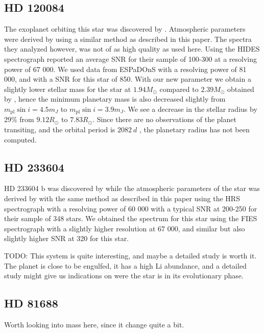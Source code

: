 \documentclass{aa}
\begin{document}
\subsection{HD 120084}
\label{sub:HD_120084}
The exoplanet orbiting this star was discovered by \citet{Sato2013}. Atmospheric
parameters were derived by \citet{Takeda2008} using a similar method as
described in this paper. The spectra they analyzed however, was not of as high
quality as used here. Using the HIDES spectrograph \citet{Takeda2008} reported
an average SNR for their sample of 100-300 at a resolving power of 67 000.
We used data from ESPaDOnS with a resolving power of 81 000, and with a SNR
for this star of 850. With our new parameter we obtain a slightly lower
stellar mass for the star at $1.94M_\odot$ compared to $2.39M_\odot$ obtained
by \cite{Takeda2008}, hence the minimum planetary mass is also decreased
slightly from $m_\mathrm{pl}\sin i=4.5m_J$ to $m_\mathrm{pl}\sin i=3.9m_J$.
We see a decrease in the stellar radius by 29\% from $9.12R_\odot$ to
$7.83R_\odot$. Since there are no observations of the planet transiting, and
the orbital period is $\SI{2082}{d}$ \citep{Sato2013}, the planetary radius
has not been computed.


\subsection{HD 233604}
\label{sub:HD_233604}
HD 233604 b was discovered by \citet{Nowak2013} while the atmospheric
parameters of the star was derived by \citet{Zielinski2012} with the same
method as described in this paper using the HRS spectrograph with a resolving
power of 60 000 with a typical SNR at 200-250 for their sample of 348 stars.
We obtained the spectrum for this star using the FIES spectrograph with a
slightly higher resolution at 67 000, and similar but also slightly higher
SNR at 320 for this star.

TODO: This system is quite interesting, and maybe a detailed study is worth it.
The planet is close to be engulfed, it has a high Li abundance, and a detailed
study might give us indications on were the star is in its evolutionary phase.


\subsection{HD 81688}
\label{sub:HD81688}
Worth looking into mass here, since it change quite a bit.
\end{document}

